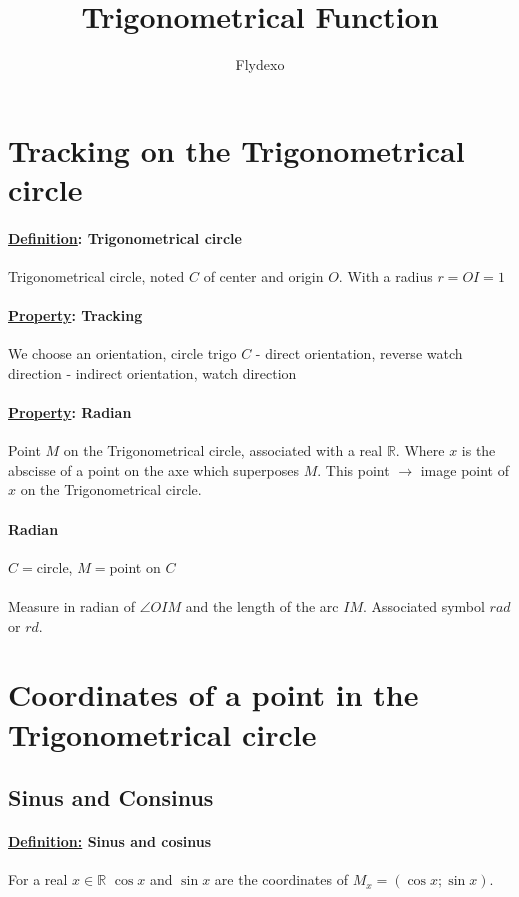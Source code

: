 \documentclass{article}
\title{Trigonometrical Function}
\author{Flydexo}
\begin{document}
\maketitle
\section{Tracking on the Trigonometrical circle}
\paragraph*{\underline{Definition}: Trigonometrical circle}
Trigonometrical circle, noted $C$ of center and origin $O$.
With a radius $r = OI = 1$
\paragraph*{\underline{Property}: Tracking}
We choose an orientation, circle trigo $C$
- direct orientation, reverse watch direction
- indirect orientation, watch direction
\paragraph*{\underline{Property}: Radian}
Point $M$ on the Trigonometrical circle, associated with 
a real $\mathbb{R}$. Where $x$ is the abscisse of a point
on the axe which superposes $M$.
This point $\rightarrow$ image point of $x$ on the Trigonometrical circle.
\paragraph*{Radian}
$C = $circle, $M = $point on $C$
\paragraph{}
Measure in radian of $\angle{OIM}$ and the length of the arc
$IM$. Associated symbol $rad$ or $rd$.
\section{Coordinates of a point in the Trigonometrical circle}
\subsection{Sinus and Consinus}
\paragraph*{\underline{Definition:} Sinus and cosinus}
For a real $x \in \mathbb{R}$ $\cos{x}$ and $\sin{x}$ are
the coordinates of $M_x = (\cos{x};\sin{x})$.
\end{document}
